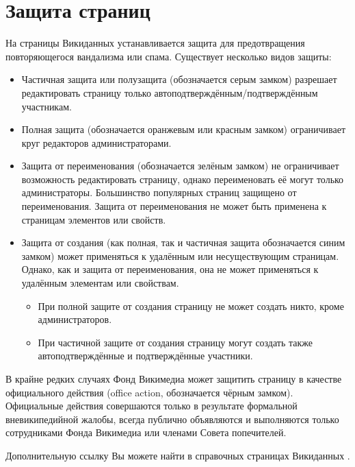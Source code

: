 \section{Защита страниц}

На страницы Викиданных устанавливается защита для предотвращения повторяющегося вандализма или спама. Существует несколько видов защиты:
\begin{itemize}
  \item Частичная защита или полузащита (обозначается серым замком) разрешает редактировать страницу только автоподтверждённым/подтверждённым участникам.
  \item Полная защита (обозначается оранжевым или красным замком) ограничивает круг редакторов администраторами.
  \item Защита от переименования (обозначается зелёным замком) не ограничивает возможность редактировать страницу, однако переименовать её могут только администраторы. Большинство популярных страниц защищено от переименования. Защита от переименования не может быть применена к страницам элементов или свойств.
  \item Защита от создания (как полная, так и частичная защита обозначается синим замком) может применяться к удалённым или несуществующим страницам. Однако, как и защита от переименования, она не может применяться к удалённым элементам или свойствам.
  \begin{itemize}
	\item При полной защите от создания страницу не может создать никто, кроме администраторов.
	\item При частичной защите от создания страницу могут создать также автоподтверждённые и подтверждённые участники.
  \end{itemize}
\end{itemize}

В крайне редких случаях Фонд Викимедиа может защитить страницу в качестве официального действия (office action, обозначается чёрным замком). Официальные действия совершаются только в результате формальной вневикипедийной жалобы, всегда публично объявляются и выполняются только сотрудниками Фонда Викимедиа или членами Совета попечителей.

Дополнительную ссылку Вы можете найти в справочных страницах Викиданных\protect\footnotemark
{}.
